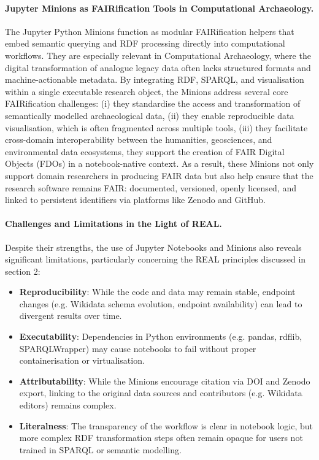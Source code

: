 \documentclass{eceasst}
\begin{document}
\paragraph{Jupyter Minions as FAIRification Tools in Computational Archaeology.} The Jupyter Python Minions function as modular FAIRification helpers that embed semantic querying and RDF processing directly into computational workflows. They are especially relevant in Computational Archaeology, where the digital transformation of analogue legacy data often lacks structured formats and machine-actionable metadata. By integrating RDF, SPARQL, and visualisation within a single executable research object, the Minions address several core FAIRification challenges: (i) they standardise the access and transformation of semantically modelled archaeological data, (ii) they enable reproducible data visualisation, which is often fragmented across multiple tools, (iii) they facilitate cross-domain interoperability between the humanities, geosciences, and environmental data ecosystems, they support the creation of FAIR Digital Objects (FDOs) in a notebook-native context. As a result, these Minions not only support domain researchers in producing FAIR data but also help ensure that the research software remains FAIR: documented, versioned, openly licensed, and linked to persistent identifiers via platforms like Zenodo and GitHub.

\paragraph{Challenges and Limitations in the Light of REAL. } Despite their strengths, the use of Jupyter Notebooks and Minions also reveals significant limitations, particularly concerning the REAL principles discussed in section 2:

\begin{itemize}
    \item \textbf{Reproducibility}: While the code and data may remain stable, endpoint changes (e.g. Wikidata schema evolution, endpoint availability) can lead to divergent results over time.
    \item \textbf{Executability}: Dependencies in Python environments (e.g. pandas, rdflib, SPARQLWrapper) may cause notebooks to fail without proper containerisation or virtualisation.
    \item \textbf{Attributability}: While the Minions encourage citation via DOI and Zenodo export, linking to the original data sources and contributors (e.g. Wikidata editors) remains complex.
    \item \textbf{Literalness}: The transparency of the workflow is clear in notebook logic, but more complex RDF transformation steps often remain opaque for users not trained in SPARQL or semantic modelling.
\end{itemize}
\end{document}
